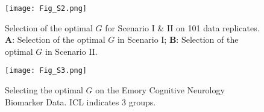 \documentclass{interact}
\theoremstyle{plain}
\theoremstyle{definition}
\theoremstyle{remark}
\begin{document}
\begin{figure}[H]
    \centering
    \texttt{[image: Fig\_S2.png]}
    \caption{\label{Supplement:Figure.2} Selection of the optimal $G$ for Scenario I \& II on 101 data replicates. \textbf{A}: Selection of the optimal $G$ in Scenario I; \textbf{B}: Selection of the optimal $G$ in Scenario II.}
\end{figure}

\begin{figure}[H]
    \centering
    \texttt{[image: Fig\_S3.png]}
    \caption{\label{Supplement:Figure.3} Selecting the optimal $G$ on the Emory Cognitive Neurology Biomarker Data. ICL indicates 3 groups.}
\end{figure}

\pagebreak



\end{document}
